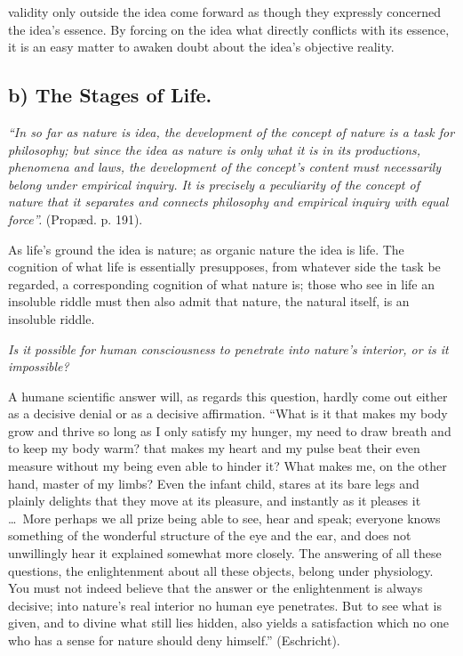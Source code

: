 \documentclass[12pt,a4paper]{book}
\begin{document}
validity only outside the idea come forward as though they expressly concerned the
idea's essence. By forcing on the idea what directly conflicts with its essence, it
is an easy matter to awaken doubt about the idea's objective reality.

\subsection*{b) The Stages of Life.}

\emph{``In so far as nature is idea, the development of the concept of nature is a
task for philosophy; but since the idea as nature is only what it is in its
productions, phenomena and laws, the development of the concept's content must
necessarily belong under empirical inquiry. It is precisely a peculiarity of the
concept of nature that it separates and connects philosophy and empirical inquiry
with equal force''.} (Propæd. p. 191).

As life's ground the idea is nature; as organic nature the idea is life. The
cognition of what life is essentially presupposes, from whatever side the task be
regarded, a corresponding cognition of what nature is; those who see in life an
insoluble riddle must then also admit that nature, the natural itself, is an
insoluble riddle.

\emph{Is it possible for human consciousness to penetrate into nature's interior,
or is it impossible?}

A humane scientific answer will, as regards this question, hardly come out either
as a decisive denial or as a decisive affirmation. ``What is it that makes my body
grow and thrive so long as I only satisfy my hunger, my need to draw breath and to
keep my body warm? that makes my heart and my pulse beat their even measure
without my being even able to hinder it? What makes me, on the other hand, master
of my limbs? Even the infant child, stares at its bare legs and
plainly delights that they move at its pleasure, and instantly as it pleases it
\dots\ More perhaps we all prize being able to see, hear and speak; everyone knows
something of the wonderful structure of the eye and the ear, and does not
unwillingly hear it explained somewhat more closely. The answering of all these
questions, the enlightenment about all these objects, belong under physiology.
You must not indeed believe that the answer or the enlightenment is always
decisive; into nature's real interior no human eye penetrates. But to see what is
given, and to divine what still lies hidden, also yields a satisfaction which no
one who has a sense for nature should deny himself.'' (Eschricht).
\end{document}
